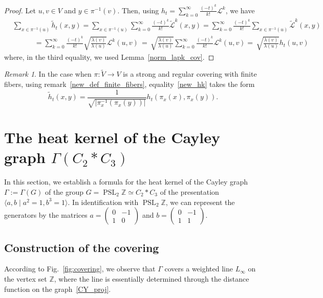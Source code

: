 \documentclass[11pt]{amsart}
\newcommand{\Z}{\mathbb{Z}}
\theoremstyle{definition}
\theoremstyle{remark}
\newtheorem{remark}{Remark}
\theoremstyle{plain}
\numberwithin{equation}{section}
\numberwithin{lemma}{section}
\numberwithin{definition}{section}
\numberwithin{proposition}{section}
\numberwithin{corollary}{section}
\numberwithin{theorem}{section}
\numberwithin{remark}{section}
\begin{document}
\begin{proof}
Let $u,v\in V$ and $y\in\pi^{-1}(v)$. Then, using $h_t=\sum_{k=0}^{\infty}\frac{(-t)^k}{k!}\mathcal{L}^k$, we have 
\begin{align*}
 & \sum_{x\in\pi^{-1}(u)}\tilde{h}_t(x,y) 
 = \sum_{x\in\pi^{-1}(u)}\sum_{k=0}^{\infty}\frac{(-t)^k}{k!}\tilde{\mathcal{L}}^k(x,y)
 = \sum_{k=0}^{\infty}\frac{(-t)^k}{k!}\sum_{x\in\pi^{-1}(u)}\tilde{\mathcal{L}}^k(x,y) \\
 & \quad \quad \quad = \sum_{k=0}^{\infty}\frac{(-t)^k}{k!}\sqrt{\frac{\lambda(v)}{\lambda(u)}}\mathcal{L}^k(u,v) \, = \, \sqrt{\frac{\lambda(v)}{\lambda(u)}}\sum_{k=0}^{\infty}\frac{(-t)^k}{k!}\mathcal{L}^k(u,v) = \, \sqrt{\frac{\lambda(v)}{\lambda(u)}}h_t(u,v)
\end{align*}
where, in the third equality, we used Lemma~\ref{norm_lapk_cov}.
\end{proof}


\begin{remark}
 In the case when $\pi \colon \tilde{V} \to V$ is a strong and regular covering with finite fibers, using remark~\ref{new_def_finite_fibers}, 
 equality~\eqref{new_hk} takes the form 
\begin{equation}\label{eq6}
 \tilde{h}_t(x,y)=\frac{1}{\sqrt{\vert\pi_x^{-1}(\pi_x(y))\vert}}h_t(\pi_x(x),\pi_x(y)).
\end{equation}
\end{remark}

\section{The heat kernel of the Cayley graph $\Gamma(C_2*C_3)$}
In this section, we establish a formula for the heat kernel of the Cayley graph $\Gamma:=\Gamma(G)$ of the group $G=\operatorname{PSL}_2\Z\simeq C_2*C_3$ of the presentation $\langle a,b\mid a^2=1,  b^3=1\rangle$.
In identification with $\operatorname{PSL}_2\Z$, we can represent the generators by the matrices
$a=\left(\begin{smallmatrix} 0 & -1 \\ 1 & 0 \end{smallmatrix}\right)$ and $b=\left(\begin{smallmatrix} 0 & -1 \\ 1 & 1 \end{smallmatrix}\right)$.


\subsection{Construction of the covering}
According to Fig.~\ref{fig:covering}, we observe that $\Gamma$
covers a weighted line $L_{\infty}$ on the vertex set $\Z$, where the line is essentially determined through the distance function on the graph~\eqref{CY_proj}.
\end{document}
